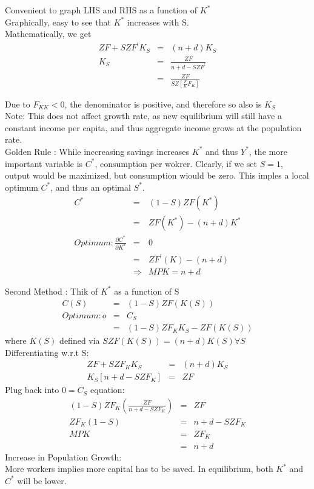 Convenient to graph LHS and RHS as a function of $K^*$\\

Graphically, easy to see that $K^*$ increases with S.\\

Mathematically, we get
\begin{eqnarray*}
ZF+SZF^\prime K_S &=& (n+d)K_S\\
K_S &=& \frac{ZF}{n+d-SZF^\prime}\\
&=& \frac{ZF}{SZ\left[ \frac{F}{K} F_K\right]}
\end{eqnarray*}

Due to $F_{KK}<0$, the denominator is positive, and therefore so also is $K_S$\\

Note: This does not affect growth rate, as new equilibrium will still have a constant income per capita, and thus aggregate income grows at the population rate.\\

Golden Rule : While inccreasing savings increases $K^*$ and thus $Y^*$, the more important variable is $C^*$, consumption per wokrer. Clearly, if we set $S=1$, output would be maximized, but consumption wiould be zero. This imples a local optimum $C^*$, and thus an optimal $S^*$.
\begin{eqnarray*}
C^* &=& (1-S) ZF(K^*)\\
&=& ZF(K^*) - (n+d)K^*\\
Optimum : \frac{\partial C^*}{\partial K^*} &=& 0\\
&=& ZF^\prime (K) - (n+d)\\
&\Rightarrow & MPK = n+d
\end{eqnarray*}

Second Method : Thik of $K^*$ as a function of S\\
\begin{eqnarray*}
C(S) &=& (1-S) ZF(K(S))\\
Optimum : o &=& C_S\\
&=& (1-S) ZF_K K_S - ZF(K(S))
\end{eqnarray*}
where $K(S)$ defined via $SZF(K(S)) = (n+d) K(S) \forall S$\\

Differentiating w.r.t S:
\begin{eqnarray*}
ZF + SZF_K K_S &=& (n+d) K_S\\
K_S\left[ n+d-SZF_K \right] &=& ZF
\end{eqnarray*}
Plug back into $0 = C_S$ equation:\\
\begin{eqnarray*}
(1-S) ZF_K \left( \frac{ZF}{n+d-SZF_K}\right) &=& ZF\\
ZF_K(1-S) &=& n+d-SZF_K\\
MPK &=& ZF_K\\
&=& n+d
\end{eqnarray*}
Increase in Population Growth:\\
More workers implies more capital has to be saved. In equilibrium, both $K^*$ and $C^*$ will be lower.\\

